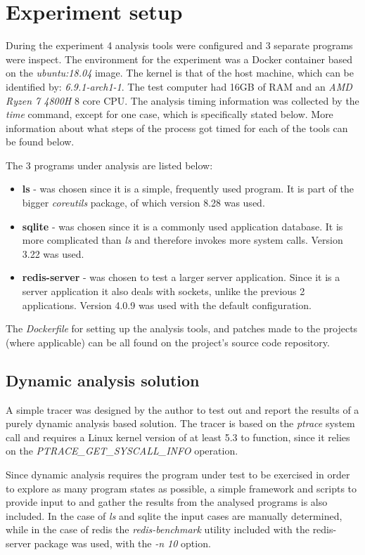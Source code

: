\section{Experiment setup}
\label{sec:setup}
During the experiment 4 analysis tools were configured and 3 separate programs were inspect.
The environment for the experiment was a Docker container based on the \textit{ubuntu:18.04} image.
The kernel is that of the host machine, which can be identified by: \textit{6.9.1-arch1-1}.
The test computer had 16GB of RAM and an \textit{AMD Ryzen 7 4800H} 8 core CPU.
The analysis timing information was collected by the \textit{time} command, except for one case, which is specifically stated below. More information about what steps of the process got timed for each of the tools can be found below.

The 3 programs under analysis are listed below:
\begin{itemize}
    \item {\textbf{ls} - was chosen since it is a simple, frequently used program. It is part of the bigger \textit{coreutils} package, of which version 8.28 was used.}
    \item {\textbf{sqlite} - was chosen since it is a commonly used application database. It is more complicated than \textit{ls} and therefore invokes more system calls. Version 3.22 was used.}
    \item {\textbf{redis-server} - was chosen to test a larger server application. Since it is a server application it also deals with sockets, unlike the previous 2 applications. Version 4.0.9 was used with the default configuration.}
\end{itemize}

The \textit{Dockerfile} for setting up the analysis tools, and patches made to the projects (where applicable) can be all found on the project's source code repository.

\subsection {Dynamic analysis solution}
A simple tracer was designed by the author to test out and report the results of a purely dynamic analysis based solution.
The tracer is based on the \textit{ptrace} system call and requires a Linux kernel version of at least 5.3 to function, since it relies on the \textit{PTRACE\_GET\_SYSCALL\_INFO} operation.

Since dynamic analysis requires the program under test to be exercised in order to explore as many program states as possible, a simple framework and scripts to provide input to and gather the results from the analysed programs is also included. In the case of \textit{ls} and sqlite the input cases are manually determined, while in the case of redis the \textit{redis-benchmark} utility included with the redis-server package was used, with the \textit{-n 10} option.

